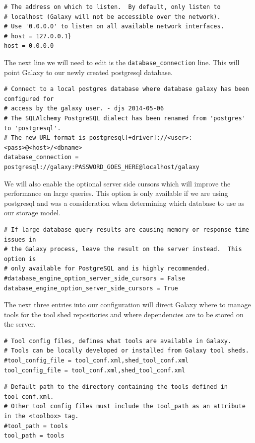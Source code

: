 \documentclass[a4paper,10pt]{article}
\begin{document}
\begin{lstlisting}
# The address on which to listen.  By default, only listen to
# localhost (Galaxy will not be accessible over the network).
# Use '0.0.0.0' to listen on all available network interfaces.
# host = 127.0.0.1}
host = 0.0.0.0
\end{lstlisting}

The next line we will need to edit is the \texttt{\footnotesize{database\_connection}} line.  This will point Galaxy to our newly created postgresql database.

\begin{lstlisting}
# Connect to a local postgres database where database galaxy has been configured for
# access by the galaxy user. - djs 2014-05-06
# The SQLAlchemy PostgreSQL dialect has been renamed from 'postgres' to 'postgresql'.
# The new URL format is postgresql[+driver]://<user>:<pass>@<host>/<dbname>
database_connection = postgresql://galaxy:PASSWORD_GOES_HERE@localhost/galaxy
\end{lstlisting}

We will also enable the optional server side cursors which will improve the performance on large queries.  This option is only available if we are using postgresql and was a consideration when determining which database to use as our storage model.

\begin{lstlisting}
# If large database query results are causing memory or response time issues in
# the Galaxy process, leave the result on the server instead.  This option is
# only available for PostgreSQL and is highly recommended.
#database_engine_option_server_side_cursors = False
database_engine_option_server_side_cursors = True
\end{lstlisting}

The next three entries into our configuration will direct Galaxy where to manage tools for the tool shed repositories and where dependencies are to be stored on the server.

\begin{lstlisting}
# Tool config files, defines what tools are available in Galaxy.
# Tools can be locally developed or installed from Galaxy tool sheds.
#tool_config_file = tool_conf.xml,shed_tool_conf.xml
tool_config_file = tool_conf.xml,shed_tool_conf.xml
\end{lstlisting}

\begin{lstlisting}
# Default path to the directory containing the tools defined in tool_conf.xml.
# Other tool config files must include the tool_path as an attribute in the <toolbox> tag.
#tool_path = tools
tool_path = tools
\end{lstlisting}
\end{document}
